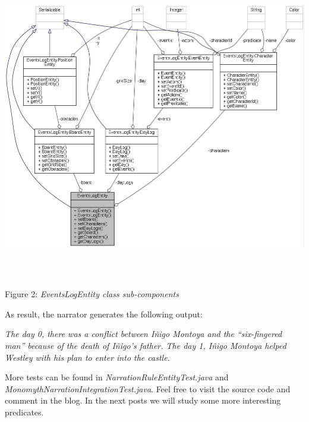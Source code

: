\documentclass[a4paper]{article}
\newcommand\textstyleEmphasis[1]{\textit{#1}}
\begin{document}
{\centering
\href{http://www.velonuboso.com/made/blog/wp-content/uploads/2015/07/classcom_1_1velonuboso_1_1made_1_1core_1_1common_1_1entity_1_1_events_log_entity__coll__graph.jpg}{
\includegraphics[width=17.544cm,height=14.196cm]{makingofmade113-img12.jpg}
}Figure 2: \textstyleEmphasis{EventsLogEntity class sub-components}
\par}

As result, the narrator generates the following output:

\textstyleEmphasis{The day 0, there was a conflict between I\~nigo
Montoya and the {\textquotedblleft}six-fingered man{\textquotedblright}
because of the death of I\~nigo{\textquoteright}s father. The day 1,
I\~nigo Montoya helped Westley with his plan to enter into the castle.}

More tests can be found in
\textstyleEmphasis{NarrationRuleEntityTest.java} and
\textstyleEmphasis{MonomythNarrationIntegrationTest.java}. Feel free to
visit the source code and comment in the blog. In the next posts we
will study some more interesting predicates.
\end{document}
